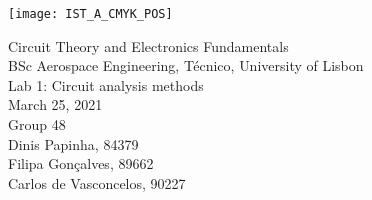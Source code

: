 
\thispagestyle {empty}

\texttt{[image: IST\_A\_CMYK\_POS]}

\begin{center}
%
\vspace{1.0cm}

\vspace{1cm}
{\FontLb Circuit Theory and Electronics Fundamentals} \\ %
\vspace{1cm}
{\FontSn BSc Aerospace Engineering, Técnico, University of Lisbon} \\ %
\vspace{1cm}
{\FontSn Lab 1: Circuit analysis methods} \\
\vspace{1cm}
{\FontSn March 25, 2021} \\ %
\vspace{1cm}
{\FontSn Group 48} \\ %
{\FontSn Dinis Papinha, 84379} \\ %
{\FontSn Filipa Gonçalves, 89662} \\ %
{\FontSn Carlos de Vasconcelos, 90227} \\ %
%
\end{center}

